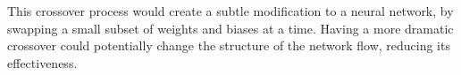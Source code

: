 \documentclass[12pt,a4paper]{article}
\makeatletter
\def\BState{\State\hskip-\ALG@thistlm}
\makeatother
\begin{document}
    This crossover process would create a subtle modification to a neural network, by swapping a small subset of weights and biases at a time. Having a more dramatic crossover could potentially change the structure of the network flow, reducing its effectiveness.



        

\end{document}
